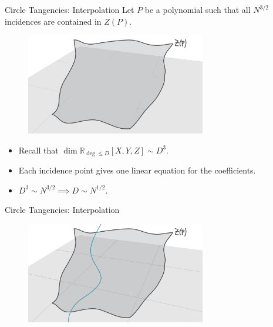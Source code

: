 \documentclass{beamer}
\newcommand{\RR}{\mathbb R}
\newcommand{\nfr}[1]{\begin{frame} #1
\end{frame}}
\begin{document}
\nfr{{Circle Tangencies: Interpolation}
Let $P$ be a polynomial such that all $N^{3/2}$ incidences are contained in $Z(P)$. 

\begin{figure}[h]
    \centering
    \includegraphics[width=0.7\textwidth]{images/lots_of_dots_d.png}
\end{figure}
\pause
\begin{itemize}
    \item Recall that $\dim \RR_{\deg \leq D} [X,Y,Z] \sim D^3$. \pause
    \item Each incidence point gives one linear equation for the coefficients. \pause
    \item $D^3 \sim N^{3/2} \implies D \sim N^{1/2}$.
\end{itemize}

}

\nfr{{Circle Tangencies: Interpolation}
\begin{figure}[h]
    \centering
    \includegraphics[width=0.7\textwidth]{images/lots_of_dots_e.png}
\end{figure}
}
\end{document}
